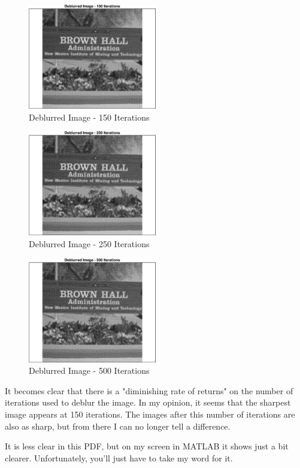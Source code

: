 \begin{figure}[h] 
	\centering
	\includegraphics[width=0.5\textwidth]{./images/prob1_deblurred_image_150_iterations.eps}
	\caption{Deblurred Image - 150 Iterations}
	\label{fig: prob1 150 iterations}
\end{figure}
\FloatBarrier

\begin{figure}[h] 
	\centering
	\includegraphics[width=0.5\textwidth]{./images/prob1_deblurred_image_250_iterations.eps}
	\caption{Deblurred Image - 250 Iterations}
	\label{fig: prob1 250 iterations}
\end{figure}
\FloatBarrier

\begin{figure}[h] 
	\centering
	\includegraphics[width=0.5\textwidth]{./images/prob1_deblurred_image_500_iterations.eps}
	\caption{Deblurred Image - 500 Iterations}
	\label{fig: prob1 500 iterations}
\end{figure}
\FloatBarrier

It becomes clear that there is a "diminishing rate of returns" on the number of iterations used to deblur the image. In my opinion, it seems that the sharpest image appears at 150 iterations. The images after this number of iterations are also as sharp, but from there I can no longer tell a difference. 

It is less clear in this PDF, but on my screen in MATLAB it shows just a bit clearer. Unfortunately, you'll just have to take my word for it.


